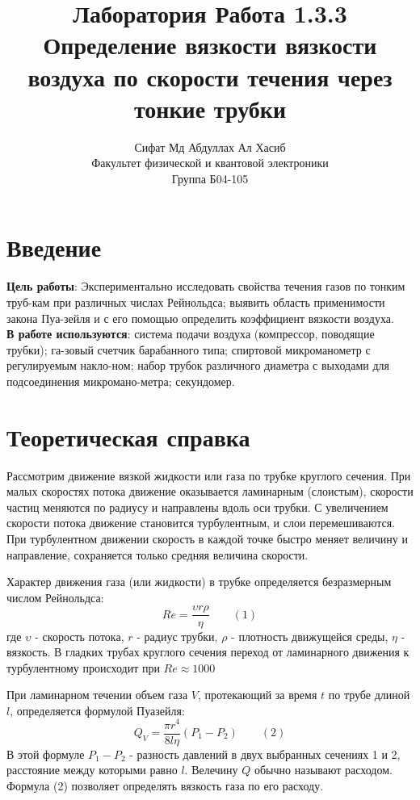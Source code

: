 \documentclass[a4paper, 12pt]{article}%
\author{Сифат Мд Абдуллах Ал Хасиб \\
Факультет физической и квантовой электроники \\
Группа Б04-105}
\title{\textbf{Лаборатория Работа 1.3.3 \\ 
Определение вязкости вязкости воздуха по скорости течения через тонкие трубки}}
\begin{document}
\maketitle
\section{Введение}\textbf{Цель работы}: Экспериментально исследовать свойства течения газов по тонким труб-кам при различных числах Рейнольдса; выявить область применимости закона Пуа-зейля и с его помощью определить коэффициент вязкости воздуха.\\
\textbf{В работе используются}: система подачи воздуха (компрессор, поводящие трубки); га-зовый счетчик барабанного типа; спиртовой микроманометр с регулируемым накло-ном; набор трубок различного диаметра с выходами для подсоединения микромано-метра; секундомер.
\section{Теоретическая справка}
Рассмотрим движение вязкой жидкости или газа по трубке круглого сечения. При малых скоростях потока движение оказывается ламинарным (слоистым), скорости частиц меняются по радиусу и направлены вдоль оси трубки. С увеличением скорости потока движение становится турбулентным, и слои перемешиваются. При турбулентном движении скорость в каждой точке быстро меняет величину и направление, сохраняется только средняя величина скорости.

Характер движения газа (или жидкости) в трубке определяется безразмерным числом Рейнольдса:
\[Re = \dfrac{\upsilon r \rho}{\eta} \text{  } \text{  } \text{  }(1)\]
где $\upsilon$ - скорость потока, $r$ - радиус трубки, $\rho$ - плотность движущейся среды, $\eta$ - вязкость. В гладких трубах круглого сечения переход от ламинарного движения к турбулентному происходит при $Re \approx 1000$

При ламинарном течении объем газа $V$, протекающий за время $t$ по трубе длиной $l$, определяется формулой Пуазейля:
\[Q_V = \dfrac{\pi r^4}{8 l \eta}(P_1 - P_2) \text{  } \text{  } \text{  }(2)\]
В этой формуле $P_1 - P_2$ - разность давлений в двух выбранных сечениях 1 и 2, расстояние между которыми равно $l$. Велечину $Q$ обычно называют расходом. Формула (2) позволяет определять вязкость газа по его расходу.
\end{document}
